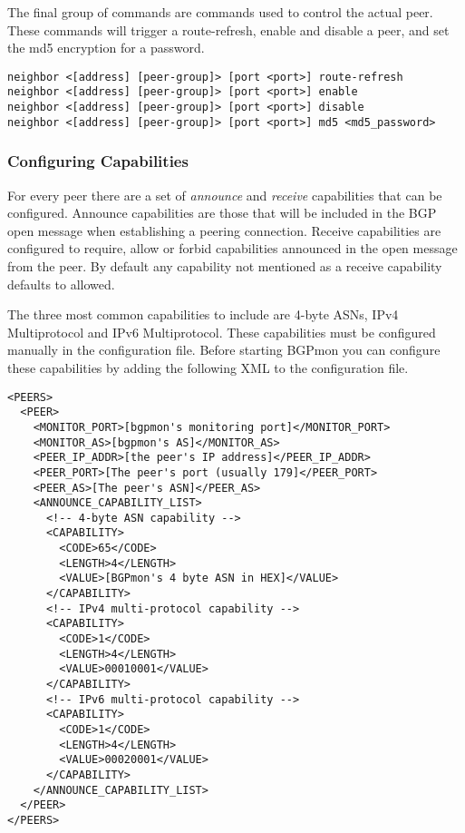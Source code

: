 The final group of commands are commands used to control the actual peer.  These commands will trigger a route-refresh, enable and disable a peer, and set the md5 encryption for a password.\\

\begin{Verbatim}[frame=single]
neighbor <[address] [peer-group]> [port <port>] route-refresh
neighbor <[address] [peer-group]> [port <port>] enable
neighbor <[address] [peer-group]> [port <port>] disable
neighbor <[address] [peer-group]> [port <port>] md5 <md5_password>
\end{Verbatim}

\subsubsection{Configuring Capabilities}
\label{sec:configure:peers:configurecapabilities}

For every peer there are a set of \emph{announce} and \emph{receive} capabilities that can be configured.
Announce capabilities are those that will be included in the BGP open message when establishing a peering connection.
Receive capabilities are configured to require, allow or forbid capabilities announced in the open message from the peer.
By default any capability not mentioned as a receive capability defaults to allowed.

The three most common capabilities to include are 4-byte ASNs, IPv4 Multiprotocol and IPv6 Multiprotocol. These capabilities must be configured manually in the configuration file.  Before starting BGPmon you can configure these capabilities by adding the following XML to the configuration file.

\begin{Verbatim}[frame=single]
<PEERS>
  <PEER>
    <MONITOR_PORT>[bgpmon's monitoring port]</MONITOR_PORT>
    <MONITOR_AS>[bgpmon's AS]</MONITOR_AS>
    <PEER_IP_ADDR>[the peer's IP address]</PEER_IP_ADDR>
    <PEER_PORT>[The peer's port (usually 179]</PEER_PORT>
    <PEER_AS>[The peer's ASN]</PEER_AS>
    <ANNOUNCE_CAPABILITY_LIST>
      <!-- 4-byte ASN capability -->
      <CAPABILITY>
        <CODE>65</CODE>
        <LENGTH>4</LENGTH>
        <VALUE>[BGPmon's 4 byte ASN in HEX]</VALUE>
      </CAPABILITY>
      <!-- IPv4 multi-protocol capability -->
      <CAPABILITY>
        <CODE>1</CODE>
        <LENGTH>4</LENGTH>
        <VALUE>00010001</VALUE>
      </CAPABILITY>
      <!-- IPv6 multi-protocol capability -->
      <CAPABILITY>
        <CODE>1</CODE>
        <LENGTH>4</LENGTH>
        <VALUE>00020001</VALUE>
      </CAPABILITY>
    </ANNOUNCE_CAPABILITY_LIST>
  </PEER>
</PEERS>
\end{Verbatim}

